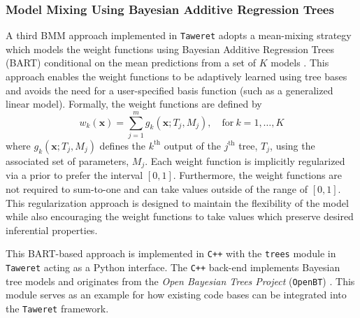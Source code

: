\documentclass[10pt, preprint,aps,prc,floatfix,
tightenlines,
nofootinbib,superscriptaddress]{revtex4-2}
\newcommand{\xvec}{\boldsymbol x}
\begin{document}
\subsubsection{Model Mixing Using Bayesian Additive Regression Trees}
    
A third BMM approach implemented in \texttt{Taweret} adopts a mean-mixing strategy which models the weight functions using Bayesian Additive Regression Trees (BART) conditional on the mean predictions from a set of $K$ models \cite{yannotty2023model}. This approach enables the weight functions to be adaptively learned using tree bases and avoids the need for a user-specified basis function (such as a generalized linear model). Formally, the weight functions are defined by 
\begin{equation}
    w_k(\xvec) = \sum_{j = 1}^m g_k(\xvec; T_j, M_j), \quad \text{for}\ k=1,\ldots,K
\end{equation}
where $g_k(\xvec;T_j,M_j)$ defines the $k^\text{th}$ output of the $j^\text{th}$ tree, $T_j$, using the associated set of parameters, $M_j$. Each weight function is implicitly regularized via a prior to prefer the interval $[0,1]$. Furthermore, the weight functions are not required to sum-to-one and can take values outside of the range of $[0,1]$. This regularization approach is designed to maintain the flexibility of the model while also encouraging the weight functions to take values which preserve desired inferential properties.

This BART-based approach is implemented in \texttt{C++} with the \texttt{trees} module in \texttt{Taweret} acting as a Python interface. The \texttt{C++} back-end implements Bayesian tree models and originates from the \textit{Open Bayesian Trees Project} (\texttt{OpenBT}) \cite{OpenBT_MTP}. This module serves as an example for how existing code bases can be integrated into the \texttt{Taweret} framework.           
\end{document}
